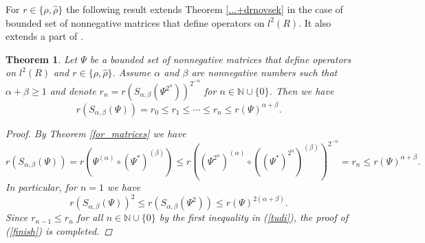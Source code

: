 \documentclass[12pt, reqno]{amsart}
\newtheorem{theorem}{Theorem}[section]
\theoremstyle{definition}
\theoremstyle{remark}
\numberwithin{equation}{section}
\newcommand{\be}{\begin{equation}}
\newcommand{\ee}{\end{equation}}
\begin{document}
For $r\in \{ \rho , \hat{\rho}\} $ the following result extends Theorem \ref{...+drnovsek} in the case of bounded set of nonnegative matrices that define operators on $l^2(R)$. It also extends a part of \cite[Theorem 3.5(ii)]{BP21}.
\begin{theorem}
\label{sym_matrices}
Let $\Psi$ be a bounded set of nonnegative matrices that define operators on $l^2(R)$ and $r \in \{ \rho, \hat{\rho}\}$. Assume $\alpha$ and $\beta$  are nonnegative numbers such that $\alpha+\beta \ge 1$ and denote $r_n=r(S_{\alpha,\beta}(\Psi^{2^n}))^{2^{-n}}$ for $n \in \mathbb{N}\cup \{0\}$. Then we have
\be
r(S_{\alpha, \beta}(\Psi))=r_{0}\le r_1\le \cdots \le r_n\le r(\Psi)^{\alpha+\beta}.
\label{finish}
\ee
\begin{proof}
 By Theorem \ref{for_matrices} we have
\be
r(S_{\alpha, \beta}(\Psi))=r(\Psi^{(\alpha)}\circ (\Psi^*)^{(\beta)})\le r\left((\Psi^{2^n})^{(\alpha)}\circ ((\Psi^*)^{2^n})^{(\beta)}\right)^{2^{-n}}=r_n\le r(\Psi)^{\alpha+\beta}.
\ee
In particular, for $n=1$ we have
\be
r(S_{\alpha, \beta}(\Psi))^2 \le r(S_{\alpha, \beta}(\Psi^2))\le r(\Psi)^{2(\alpha +\beta)}.
\label{tudi}
\ee
Since $r_{n-1} \le r_{n}$ for all $n \in \mathbb{N}\cup \{0\}$  by the first inequality in (\ref{tudi}), the proof of (\ref{finish}) is completed.
\end{proof}
\end{theorem}
\end{document}
